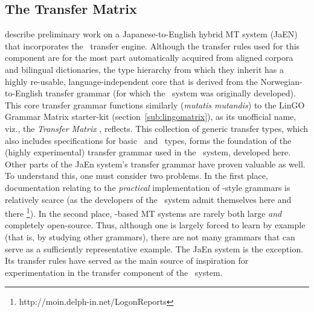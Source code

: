 
\subsection{The Transfer Matrix}

\citet{bond2005open} describe preliminary work on a Japanese-to-English hybrid
MT system (JaEN) that incorporates the \logon\ transfer engine. Although the
transfer rules used for this component are for the most part automatically
acquired from aligned corpora and bilingual dictionaries, the type hierarchy
from which they inherit has a highly re-usable, language-independent core that
is derived from the Norwegian-to-English transfer grammar
\citep{Lonning04logon.a} (for which the \logon\ system was originally
developed). This core transfer grammar functions similarly (\emph{mutatis
mutandis}) to the LinGO Grammar Matrix starter-kit
(section~\ref{sub:lingomatrix}), as its unofficial name, viz., the
\emph{Transfer Matrix} \citep{bond2011deep}, reflects. This collection of
generic transfer types, which also includes specifications for basic \mrs\ and
\mtr\ types, forms the foundation of the (highly experimental) transfer grammar
used in the \depicto\ system, developed here. Other parts of the JaEn system's
transfer grammar have proven valuable as well. To understand this, one must
consider two problems. In the first place, documentation relating to the
\emph{practical} implementation of \logon-style grammars is relatively scarce
(as the developers of the \logon\ system admit themselves here and there
\footnote{http://moin.delph-in.net/LogonReports}). In the second place,
\logon-based MT systems are rarely both large \emph{and} completely
open-source. Thus, although one is largely forced to learn by example (that is,
by studying other grammars), there are not many grammars that can serve as a
sufficiently representative example. The JaEn system \citep{bond2011deep} is
the exception. Its transfer rules have served as the main source of inspiration
for experimentation in the transfer component of the \depicto\ system.

